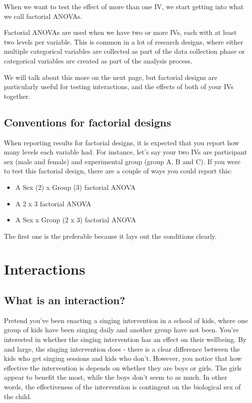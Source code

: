\documentclass[
]{book}
\providecommand{\tightlist}{%
  \setlength{\itemsep}{0pt}\setlength{\parskip}{0pt}}
\begin{document}
When we want to test the effect of more than one IV, we start getting into what we call factorial ANOVAs.

Factorial ANOVAs are used when we have two or more IVs, each with at least two levels per variable. This is common in a lot of research designs, where either multiple categorical variables are collected as part of the data collection phase or categorical variables are created as part of the analysis process.

We will talk about this more on the next page, but factorial designs are particularly useful for testing interactions, and the effects of both of your IVs together.

\hypertarget{conventions-for-factorial-designs}{%
\subsection{Conventions for factorial designs}\label{conventions-for-factorial-designs}}

When reporting results for factorial designs, it is expected that you report how many levels each variable had. For instance, let's say your two IVs are participant sex (male and female) and experimental group (group A, B and C). If you were to test this factorial design, there are a couple of ways you could report this:

\begin{itemize}
\tightlist
\item
  A Sex (2) x Group (3) factorial ANOVA
\item
  A 2 x 3 factorial ANOVA
\item
  A Sex x Group (2 x 3) factorial ANOVA
\end{itemize}

The first one is the preferable because it lays out the conditions clearly.

\hypertarget{interactions}{%
\section{Interactions}\label{interactions}}

\hypertarget{what-is-an-interaction}{%
\subsection{What is an interaction?}\label{what-is-an-interaction}}

Pretend you've been enacting a singing intervention in a school of kids, where one group of kids have been singing daily and another group have not been. You're interested in whether the singing intervention has an effect on their wellbeing. By and large, the singing intervention does - there is a clear difference between the kids who get singing sessions and kids who don't. However, you notice that how effective the intervention is depends on whether they are boys or girls. The girls appear to benefit the most, while the boys don't seem to as much. In other words, the effectiveness of the intervention is contingent on the biological sex of the child.
\end{document}
